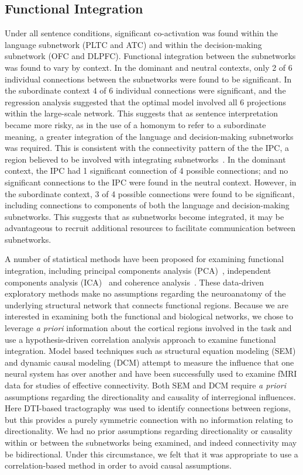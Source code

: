 \documentclass[final,authoryear,5p,times,twocolumn]{elsarticle}
\begin{document}
\subsection{Functional Integration}
Under all sentence conditions, significant co-activation was found within the language subnetwork (PLTC and ATC) and within the decision-making subnetwork (OFC and DLPFC). Functional integration between the subnetworks was found to vary by context. In the dominant and neutral contexts, only 2 of 6 individual connections between the subnetworks were found to be significant. In the subordinate context 4 of 6 individual connections were significant, and the regression analysis suggested that the optimal model involved all 6 projections within the large-scale network. This suggests that as sentence interpretation became more risky, as in the use of a homonym to refer to a subordinate meaning, a greater integration of the language and decision-making subnetworks was required. This is consistent with the connectivity pattern of the the IPC, a region believed to be involved with integrating subnetworks~\cite{Jaencke2001,Assmus2003}. In the dominant context, the IPC had 1 significant connection of 4 possible connections; and no significant connections to the IPC were found in the neutral context. However, in the subordinate context, 3 of 4 possible connections were found to be significant, including connections to components of both the language and decision-making subnetworks. This suggests that as subnetworks become integrated, it may be advantageous to recruit additional resources to facilitate communication between subnetworks.

A number of statistical methods have been proposed for examining functional integration, including principal components analysis (PCA)~\cite{Kadosh2008,Friston2000}, independent components analysis (ICA)~\cite{Greicius2007,Calhoun2008} and coherence analysis~\cite{Sun2004}. These data-driven exploratory methods make no assumptions regarding the neuroanatomy of the underlying structural network that connects functional regions. Because we are interested in examining both the functional and biological networks, we chose to leverage \emph{a priori} information about the cortical regions involved in the task and use a hypothesis-driven correlation analysis approach to examine functional integration. Model based techniques such as structural equation modeling (SEM) and dynamic causal modeling (DCM) attempt to measure the influence that one neural system has over another and have been successfully used to examine fMRI data for studies of effective connectivity. Both SEM and DCM require \emph{a priori} assumptions regarding the directionality and causality of interregional influences. Here DTI-based tractography was used to identify connections between regions, but this provides a purely symmetric connection with no information relating to directionality. We had no prior assumptions regarding directionality or causality within or between the subnetworks being examined, and indeed connectivity may be bidirectional. Under this circumstance, we felt that it was appropriate to use a correlation-based method in order to avoid causal assumptions.
\end{document}
